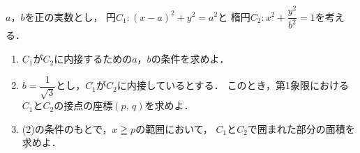 \documentclass[../../main.tex]{subfiles}
\begin{document}
$a$，$b$を正の実数とし，
円$C_1:{(x-a)}^2+y^2=a^2$と
楕円$\displaystyle C_2:x^2+\dfrac{y^2}{b^2}=1$を考える．
\begin{enumerate}
  \item $C_1$が$C_2$に内接するための$a$，$b$の条件を求めよ．
  \item $\displaystyle b=\dfrac{1}{\sqrt{3}}$とし，$C_1$が$C_2$に内接しているとする．
    このとき，第1象限における$C_1$と$C_2$の接点の座標$(p, \, q)$を求めよ．
  \item (2)の条件のもとで，$x \geqq p$の範囲において，
    $C_1$と$C_2$で囲まれた部分の面積を求めよ．
\end{enumerate}
\end{document}
